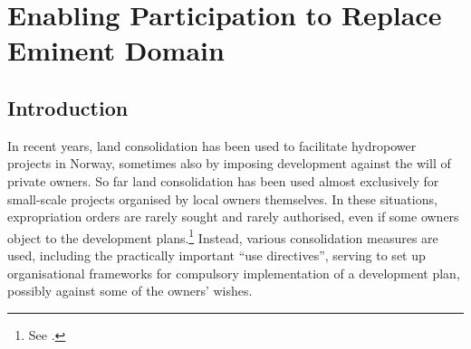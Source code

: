 \chapter{Enabling Participation to Replace Eminent Domain}\label{chap:6}

\section{Introduction}\label{sec:6:1}


In recent years, land consolidation has been used to facilitate hydropower projects in Norway, sometimes also by imposing development against the will of private owners. So far land consolidation has been used almost exclusively for small-scale projects organised by local owners themselves. In these situations, expropriation orders are rarely sought and rarely authorised, even if some owners object to the development plans.\footnote{See \cite{brekken08}.} Instead, various consolidation measures are used, including the practically important ``use directives'', serving to set up organisational frameworks for compulsory implementation of a development plan, possibly against some of the owners' wishes.

